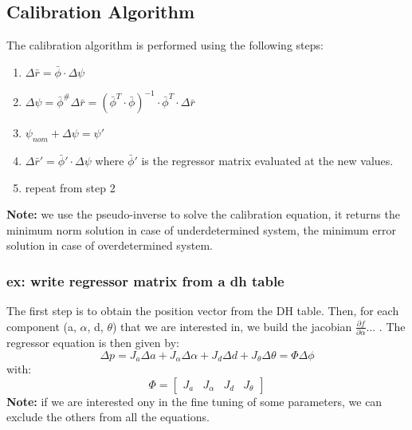 \documentclass[a4paper,12pt]{article}
\begin{document}
\subsection{Calibration Algorithm}
The calibration algorithm is performed using the following steps:
\begin{enumerate}
    \item $\Delta \bar{r}= \bar{\phi} \cdot \Delta \psi$
    \item $\Delta \psi = \bar{\phi}^\# \Delta\bar{r}= (\bar{\phi}^T \cdot \bar{\phi})^{-1} \cdot \bar{\phi}^T \cdot \Delta \bar{r}$
    \item $ \psi_{nom} + \Delta \psi = \psi ' $
    \item $ \Delta \bar{r}' = \bar{\phi}' \cdot \Delta \psi$ where $\bar{\phi}'$ is the regressor
     matrix evaluated at the new values.
    \item repeat from step 2
\end{enumerate}
\textbf{Note:} we use the pseudo-inverse to solve the calibration equation,
it returns the minimum norm solution in case of underdetermined system,
the minimum error solution in case of overdetermined system.
\subsubsection{ex: write regressor matrix from a dh table}
The first step is to obtain the position vector from the DH table.
Then, for each component (a, $\alpha$, d, $\theta$) that we are interested in, we
build the jacobian $ \frac{\partial f}{\partial \alpha} $... .
The regressor equation is then given by:
\begin{equation}
    \Delta p = J_a \Delta a + J_{\alpha} \Delta \alpha + J_d \Delta d + J_{\theta} \Delta \theta= \Phi \Delta \phi
\end{equation}
with:
\begin{equation}
    \Phi = \begin{bmatrix}
        J_a & J_{\alpha} & J_d & J_{\theta}
    \end{bmatrix}
\end{equation}
\textbf{Note:} if we are interested ony in the fine tuning of some parameters, we can
exclude the others from all the equations.
\end{document}
